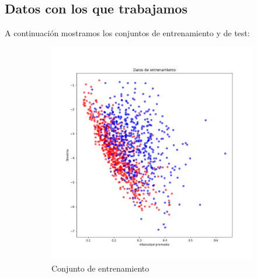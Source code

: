 \documentclass[11pt]{article}
\begin{document}
\subsection{Datos con los que trabajamos}

A continuación mostramos los conjuntos de entrenamiento y de test:

\begin{figure}[H]
    \begin{subfigure}{0.4\textwidth}
        \includegraphics[scale=0.3]{bonus_learning}
        \caption{Conjunto de entrenamiento}
    \end{subfigure} \hspace{0.2\textwidth}
    \begin{subfigure}{0.4\textwidth}

\end{subfigure}
\end{figure}
\end{document}
